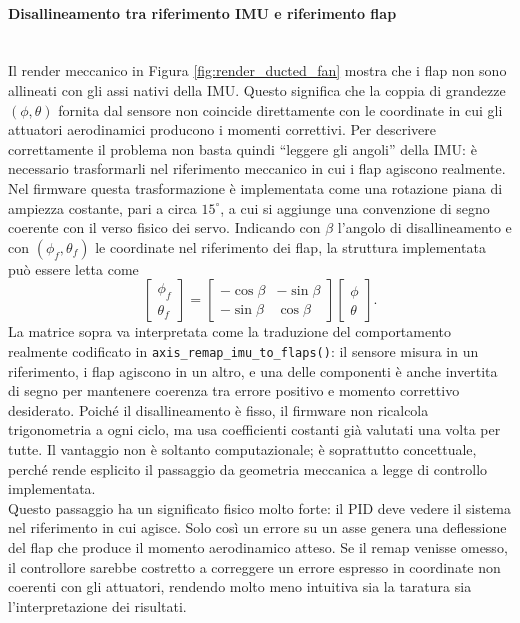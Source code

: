 \documentclass[11pt]{report}
\begin{document}
	\paragraph{Disallineamento tra riferimento IMU e riferimento flap}\mbox{}\\
	Il render meccanico in Figura \ref{fig:render_ducted_fan} mostra che i flap non sono allineati con gli assi nativi della IMU. Questo significa che la coppia di grandezze $(\phi,\theta)$ fornita dal sensore non coincide direttamente con le coordinate in cui gli attuatori aerodinamici producono i momenti correttivi. Per descrivere correttamente il problema non basta quindi ``leggere gli angoli'' della IMU: è necessario trasformarli nel riferimento meccanico in cui i flap agiscono realmente.\\
	Nel firmware questa trasformazione è implementata come una rotazione piana di ampiezza costante, pari a circa $15^{\circ}$, a cui si aggiunge una convenzione di segno coerente con il verso fisico dei servo. Indicando con $\beta$ l'angolo di disallineamento e con $(\phi_f,\theta_f)$ le coordinate nel riferimento dei flap, la struttura implementata può essere letta come
	\begin{equation}
		\begin{bmatrix}
			\phi_f \\
			\theta_f
		\end{bmatrix}
		=
		\begin{bmatrix}
			-\cos\beta & -\sin\beta \\
			-\sin\beta & \cos\beta
		\end{bmatrix}
		\begin{bmatrix}
			\phi \\
			\theta
		\end{bmatrix}.
	\end{equation}
	La matrice sopra va interpretata come la traduzione del comportamento realmente codificato in \texttt{axis\_remap\_imu\_to\_flaps()}: il sensore misura in un riferimento, i flap agiscono in un altro, e una delle componenti è anche invertita di segno per mantenere coerenza tra errore positivo e momento correttivo desiderato. Poiché il disallineamento è fisso, il firmware non ricalcola trigonometria a ogni ciclo, ma usa coefficienti costanti già valutati una volta per tutte. Il vantaggio non è soltanto computazionale; è soprattutto concettuale, perché rende esplicito il passaggio da geometria meccanica a legge di controllo implementata.\\
	Questo passaggio ha un significato fisico molto forte: il PID deve vedere il sistema nel riferimento in cui agisce. Solo così un errore su un asse genera una deflessione del flap che produce il momento aerodinamico atteso. Se il remap venisse omesso, il controllore sarebbe costretto a correggere un errore espresso in coordinate non coerenti con gli attuatori, rendendo molto meno intuitiva sia la taratura sia l'interpretazione dei risultati.\\
\end{document}
